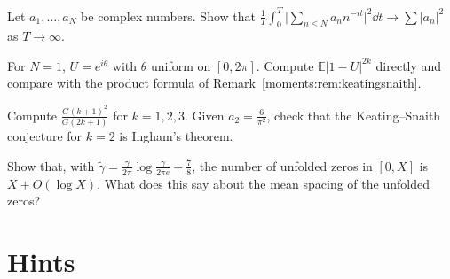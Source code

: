 \begin{exercise}[$\star$]\label{moments:ex:fixedN}
Let $a_1,\dots,a_N$ be complex numbers. Show that $\frac1T\int_0^T\bigl|\sum_{n\le N}a_nn^{-it}\bigr|^2\dd t\to\sum|a_n|^2$ as $T\to\infty$.
\end{exercise}

\begin{exercise}[$\star\star$]\label{moments:ex:cue1}
For $N=1$, $U=e^{i\theta}$ with $\theta$ uniform on $[0,2\pi]$. Compute $\mathbb E|1-U|^{2k}$ directly and compare with the product formula of
Remark~\ref{moments:rem:keatingsnaith}.
\end{exercise}

\begin{exercise}[$\star$]\label{moments:ex:barnes}
Compute $\frac{G(k+1)^2}{G(2k+1)}$ for $k=1,2,3$. Given $a_2=\frac6{\pi^2}$, check that the Keating--Snaith conjecture for $k=2$ is Ingham's theorem.
\end{exercise}

\begin{exercise}[$\star\star$]\label{moments:ex:unfold}
Show that, with $\tilde\gamma=\frac\gamma{2\pi}\log\frac\gamma{2\pi e}+\frac78$, the number of unfolded zeros in $[0,X]$ is $X+O(\log X)$. What does this say about the
mean spacing of the unfolded zeros?
\end{exercise}

\section{Hints}

